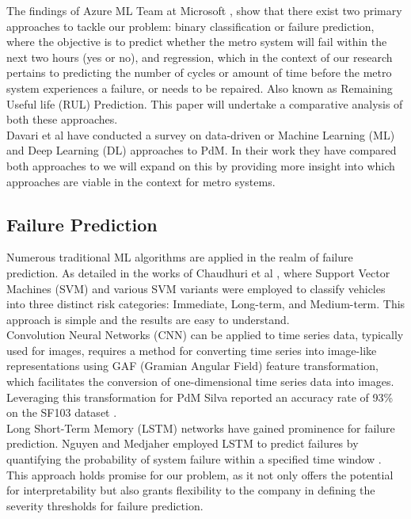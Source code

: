 \documentclass{article}
\begin{document}
The findings of Azure ML Team at Microsoft \cite{AzureML2015}, show that there exist two primary approaches to tackle our problem: binary classification or failure prediction, where the objective is to predict whether the metro system will fail within the next two hours (yes or no), and regression, which in the context of our research pertains to predicting the number of cycles or amount of time before the metro system experiences a failure, or needs to be repaired. Also known as Remaining Useful life (RUL) Prediction. This paper will undertake a comparative analysis of both these approaches. \\

Davari et al \cite{Davari2021} have conducted a survey on data-driven or Machine Learning (ML) and Deep Learning (DL) approaches to PdM. In their work they have compared both approaches to we will expand on this by providing more insight into which approaches are viable in the context for metro systems.

\subsection*{Failure Prediction}

Numerous traditional ML algorithms are applied in the realm of failure prediction. As detailed in the works of Chaudhuri et al \cite{chaudhuri2018}, where Support Vector Machines (SVM) and various SVM variants were employed to classify vehicles into three distinct risk categories: Immediate, Long-term, and Medium-term. This approach is simple and the results are easy to understand. \\

Convolution Neural Networks (CNN) can be applied to time series data, typically used for
images, requires a method for converting time series into image-like representations using GAF (Gramian Angular Field) feature transformation, which facilitates the conversion of one-dimensional time series data into images. Leveraging this transformation for PdM Silva reported an accuracy rate of 93\% on the SF103 dataset \cite{Silva2019}. \\

Long Short-Term Memory (LSTM) networks have gained prominence for failure prediction. Nguyen and Medjaher employed LSTM to predict failures by quantifying the probability of system failure within a specified time window \cite{nguyen2019}. This approach holds promise for our problem, as it not only offers the potential for interpretability but also grants flexibility to the company in defining the severity thresholds for failure prediction.
\end{document}
